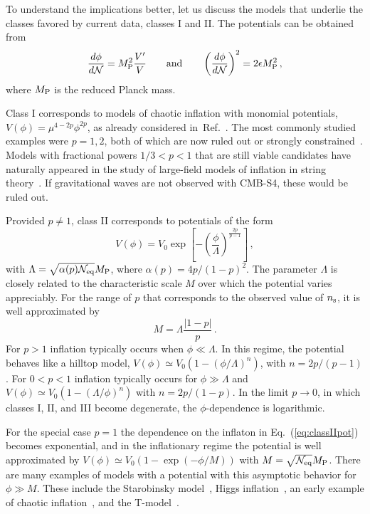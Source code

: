To understand the implications better, let us discuss the models that underlie the classes favored by current data, classes I and II. The  potentials can be obtained from 
\begin{equation}
\frac{d\phi}{d\mathcal{N}}=M_{\rm P}^2\frac{V'}{V}\qquad{\rm and}\qquad \left(\frac{d\phi}{d\mathcal{N}}\right)^2=2\epsilon M_{\rm P}^2\,,
\end{equation}
where $M_{\rm P}$ is the reduced Planck mass.

Class I corresponds to models of chaotic inflation with monomial potentials, $V(\phi)=\mu^{4-2p}\phi^{2p}$,
as already considered in~Ref.~\cite{Linde:1983gd}. The most commonly studied examples were $p=1,2$, both of which are now ruled out or strongly constrained~\cite{Ade:2015tva}. Models with fractional powers $1/3<p<1$ that are still viable candidates have naturally appeared in the study of large-field models of inflation in string theory~\cite{Silverstein:2008sg,McAllister:2008hb,Flauger:2009ab}. If gravitational waves are not observed with CMB-S4, these would be ruled out.

Provided $p\neq 1$, class II corresponds to potentials of the form 
\begin{equation}\label{eq:classIIpot}
V(\phi)=V_0\exp\left[-\left(\frac{\phi}{\Lambda}\right)^{\frac{2p}{p-1}}\right]\,,
\end{equation}
with $\Lambda=\sqrt{\alpha(p)\mathcal{N}_{\rm eq}}M_{\rm P}$, where $\alpha(p)=4p/(1-p)^2$. The parameter $\Lambda$ is closely related to the characteristic scale $M$ over which the potential varies appreciably. For the range of $p$ that corresponds to the observed value of $n_{\rm s}$, it is well approximated by
\begin{equation}\label{eq:potscale}
M=\Lambda\frac{|1-p|}{p}\,.
\end{equation}
For $p>1$ inflation typically occurs when $\phi\ll \Lambda$. In this regime, the potential behaves like a hilltop model, $V(\phi)\simeq V_0(1-\left(\phi/\Lambda\right)^n)$, with $n=2p/(p-1)$. For $0<p<1$ inflation typically occurs for $\phi\gg \Lambda$ and $V(\phi)\simeq V_0(1-\left(\Lambda/\phi\right)^n)$ with $n=2p/(1-p)$. In the limit $p\to0$, in which classes I, II, and III become degenerate, the $\phi$-dependence is logarithmic. 

For the special case $p=1$ the dependence on the inflaton in Eq.~(\ref{eq:classIIpot}) becomes exponential, and in the inflationary regime the potential is well approximated by $V(\phi)\simeq V_0\left(1-\exp\left(-\phi/M\right)\right)$ with $M=\sqrt{\mathcal{N}_{\rm eq}}M_{\rm P}$. There are many examples of models with a potential with this asymptotic behavior for $\phi\gg M$. These include the Starobinsky model~\cite{Starobinsky:1980te}, Higgs inflation~\cite{Salopek:1988qh,Bezrukov:2007ep}, an early example of chaotic inflation~\cite{Goncharov:1983mw}, and the T-model~\cite{Kallosh:2013hoa}.

